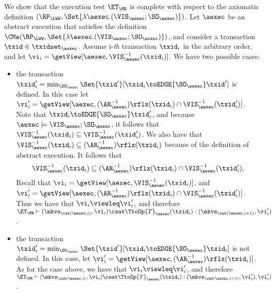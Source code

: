 We show that the execution test $\ET_{\MR}$ is complete 
with respect to the axiomatic definition $(\RP_{\LWW}, \Set{\lambda \aexec.(\VIS_{\aexec};\SO_{\aexec})})$. 
Let $\aexec$ be an abstract execution that satisfies the definition
$\CMa(\RP_{\LWW}, \Set{\lambda \aexec.(\VIS_{\aexec};\SO_{\aexec})})$, 
and consider a transaction $\txid \in \txidset_{\aexec}$. 
Assume i-\emph{th} transaction \( \txid_i \) in the arbitrary order,
and let $\vi_i = \getView[\aexec, \VIS^{-1}_{\aexec}(\txid_{i})]$.
We have two possible cases: 
\begin{itemize}
    \item the transaction $\txid'_{i} = \min_{\SO_{\aexec}}\Set{\txid' }[ \txid_{i} \toEDGE{\SO_{\aexec}} \txid']$ is 
defined. In this case let $\vi'_{i} =\getView[\aexec, (\AR^{-1}_{\aexec})\rflx(\txid_{i}) \cap \VIS^{-1}_{\aexec}(\txid'_{i})]$. 
Note that $\txid_{i} \toEDGE{\SO_{\aexec}} \txid'_{i}$, and because $\aexec \models \VIS_{\aexec} ; \SO_{\aexec}$, 
it follows that $\VIS^{-1}_{\aexec}(\txid_{i}) \subseteq \VIS^{-1}_{\aexec}(\txid'_{i})$. 
We also have that $\VIS^{-1}_{\aexec}(\txid_{i}) \subseteq (\AR^{-1}_{\aexec})\rflx(\txid_{i})$ because of 
the definition of abstract execution. It follows that 
\[
\VIS^{-1}_{\aexec}(\txid_{i}) \subseteq (\AR^{-1}_{\aexec})\rflx(\txid_{i}) \cap \VIS^{-1}_{\aexec}(\txid'_{i}),
\]
Recall that  $\vi_i = \getView[\aexec, \VIS^{-1}_{\aexec}(\txid_{i})]$,
and $\vi'_{i} =\getView[\aexec, (\AR^{-1}_{\aexec})\rflx(\txid_{i}) \cap \VIS^{-1}_{\aexec}(\txid'_{i})]$.
Thus we have that $\vi_i \viewleq \vi'_{i}$, and therefore $\ET_{\MR} \vdash (\mkvs_{\cut(\aexec, i)}, \vi_i) 
\csat \TtoOp{T}_{\aexec}(\txid_{i}) : (\mkvs_{\cut(\aexec, i+1)},\vi'_{i})$. 
\item the transaction $\txid'_{i} = \min_{\SO_{\aexec}}\Set{\txid' }[ \txid_{i} \toEDGE{\SO_{\aexec}} \txid_{i}]$ 
is not defined. In this case, let $\vi'_{i} = \getView[\aexec, (\AR^{-1}_{\aexec})\rflx(\txid_{i})]$.
As for the case above, we have that $\vi_i \viewleq \vi'_{i}$, and therefore 
$\ET_{\MR} \vdash (\mkvs_{\cut(\aexec, i)}, \vi_i) \csat \TtoOp{T}_{\aexec}(\txid_{i}) : (\mkvs_{\cut(\aexec, i+1)},\vi'_{i}),\vi'_{i})$. 
\end{itemize}
